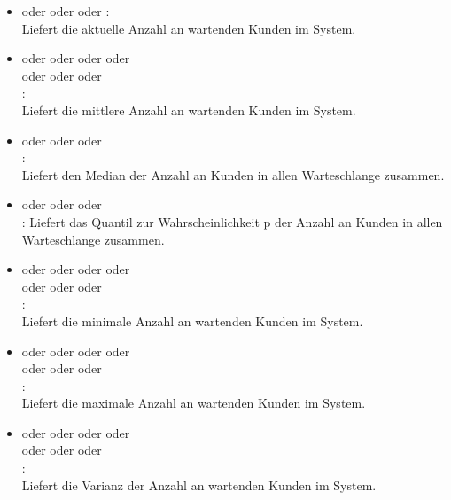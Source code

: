 \begin{itemize}    

\item
{} oder  oder  oder :\\
Liefert die aktuelle Anzahl an wartenden Kunden im System.

\item
{} oder  oder  oder  oder\\
 oder  oder  oder\\
:\\
Liefert die mittlere Anzahl an wartenden Kunden im System.

\item
{} oder  oder  oder\\
:\\
Liefert den Median der Anzahl an Kunden in allen Warteschlange zusammen.

\item
{} oder  oder  oder\\
:
Liefert das Quantil zur Wahrscheinlichkeit p der Anzahl an Kunden in allen Warteschlange zusammen.

\item
{} oder  oder  oder  oder\\
 oder  oder  oder\\
:\\
Liefert die minimale Anzahl an wartenden Kunden im System.

\item
{} oder  oder  oder  oder\\
 oder  oder  oder\\
:\\
Liefert die maximale Anzahl an wartenden Kunden im System.

\item
{} oder  oder  oder  oder\\
 oder  oder  oder\\
:\\
Liefert die Varianz der Anzahl an wartenden Kunden im System.


\end{itemize}
